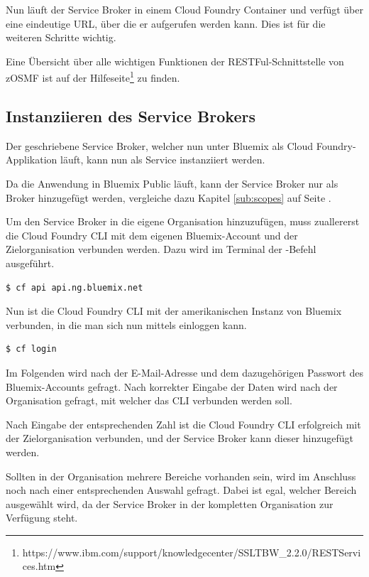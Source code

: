 Nun läuft der Service Broker in einem Cloud Foundry Container und verfügt über eine eindeutige URL, über die er aufgerufen
werden kann. Dies ist für die weiteren Schritte wichtig.

Eine Übersicht über alle wichtigen Funktionen der RESTFul-Schnittstelle von zOSMF ist auf der
Hilfeseite\footnote{https://www.ibm.com/support/knowledgecenter/SSLTBW\_2.2.0/RESTServices.htm} zu finden.

\subsection{Instanziieren des Service Brokers}
Der geschriebene Service Broker, welcher nun unter Bluemix als Cloud Foundry-Applikation läuft, kann nun als Service
instanziiert werden.

Da die Anwendung in Bluemix Public läuft, kann der Service Broker nur als  Broker hinzugefügt
werden, vergleiche dazu Kapitel \ref{sub:scopes} auf Seite \pageref{sub:scopes}.

Um den Service Broker in die eigene Organisation hinzuzufügen, muss zuallererst die Cloud Foundry CLI mit dem eigenen
Bluemix-Account und der Zielorganisation verbunden werden. Dazu wird im Terminal der -Befehl ausgeführt.

\begin{lstlisting}[language=bash, caption=Definieren der API über die Cloud Foundry CLI, label=Definieren der API über die Cloud Foundry CLI]
   $ cf api api.ng.bluemix.net
\end{lstlisting}

Nun ist die Cloud Foundry CLI mit der amerikanischen Instanz von Bluemix verbunden, in die man sich nun mittels
 einloggen kann.

\begin{lstlisting}[language=bash, caption=Einloggen über die Cloud Foundry CLI, label=Einloggen über die Cloud Foundry CLI]
   $ cf login
\end{lstlisting}

Im Folgenden wird nach der E-Mail-Adresse und dem dazugehörigen Passwort des Bluemix-Accounts gefragt. Nach korrekter
Eingabe der Daten wird nach der Organisation gefragt, mit welcher das CLI verbunden werden soll.

Nach Eingabe der entsprechenden Zahl ist die Cloud Foundry CLI erfolgreich mit der Zielorganisation verbunden, und der
Service Broker kann dieser hinzugefügt werden.

Sollten in der Organisation mehrere Bereiche vorhanden sein, wird im Anschluss noch nach einer entsprechenden Auswahl
gefragt. Dabei ist egal, welcher Bereich ausgewählt wird, da der Service Broker in der kompletten Organisation zur Verfügung
steht.

